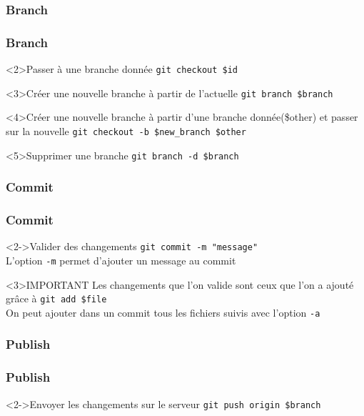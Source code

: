 	\subsubsection{Branch}
		\begin{frame}[fragile]
			\frametitle{Branch}
			\begin{block}<2>{Passer à une branche donnée}
				\verb'git checkout $id'
			\end{block}
			\begin{block}<3>{Créer une nouvelle branche à partir de l'actuelle}
				\verb'git branch $branch'
			\end{block}
			\begin{block}<4>{Créer une nouvelle branche à partir d'une branche donnée(\$other) et passer sur la nouvelle}
				\verb'git checkout -b $new_branch $other'
			\end{block}
			\begin{alertblock}<5>{Supprimer une branche}
				\verb'git branch -d $branch'
			\end{alertblock}

			
		\end{frame}
	\subsubsection{Commit}
		\begin{frame}[fragile]
			\frametitle{Commit}
			\begin{block}<2->{Valider des changements}
				\verb'git commit -m "message"'\\
				L'option \verb'-m' permet d'ajouter un message au commit				
			\end{block}
			\begin{alertblock}<3>{IMPORTANT}
				Les changements que l'on valide sont ceux que l'on a ajouté grâce à \verb'git add $file'\\
				On peut ajouter dans un commit tous les fichiers suivis avec l'option \verb'-a'
			\end{alertblock}
			
		\end{frame}
	\subsubsection{Publish}
		\begin{frame}[fragile]
			\frametitle{Publish}
			\begin{block}<2->{Envoyer les changements sur le serveur}
				\verb'git push origin $branch'\\	
			\end{block}
		\end{frame}


